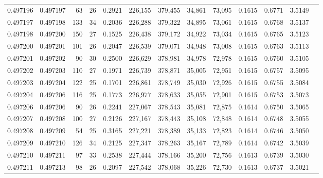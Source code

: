 \begin{tabular}{rrrrrrrrrrrrr}
0.497196 & 0.497197 &  63 &  26 &                                     0.2921 & 226,155 & 379,455 &  34,861 &  73,095 & 0.1615 & 0.6771 & 3.5149 \\
0.497197 & 0.497198 & 133 &  34 &                                     0.2036 & 226,288 & 379,322 &  34,895 &  73,061 & 0.1615 & 0.6768 & 3.5137 \\
0.497198 & 0.497200 & 150 &  27 &                                     0.1525 & 226,438 & 379,172 &  34,922 &  73,034 & 0.1615 & 0.6765 & 3.5123 \\
0.497200 & 0.497201 & 101 &  26 &                                     0.2047 & 226,539 & 379,071 &  34,948 &  73,008 & 0.1615 & 0.6763 & 3.5113 \\
0.497201 & 0.497202 &  90 &  30 &                                     0.2500 & 226,629 & 378,981 &  34,978 &  72,978 & 0.1615 & 0.6760 & 3.5105 \\
0.497202 & 0.497203 & 110 &  27 &                                     0.1971 & 226,739 & 378,871 &  35,005 &  72,951 & 0.1615 & 0.6757 & 3.5095 \\
0.497203 & 0.497204 & 122 &  25 &                                     0.1701 & 226,861 & 378,749 &  35,030 &  72,926 & 0.1615 & 0.6755 & 3.5084 \\
0.497204 & 0.497206 & 116 &  25 &                                     0.1773 & 226,977 & 378,633 &  35,055 &  72,901 & 0.1615 & 0.6753 & 3.5073 \\
0.497206 & 0.497206 &  90 &  26 &                                     0.2241 & 227,067 & 378,543 &  35,081 &  72,875 & 0.1614 & 0.6750 & 3.5065 \\
0.497207 & 0.497208 & 100 &  27 &                                     0.2126 & 227,167 & 378,443 &  35,108 &  72,848 & 0.1614 & 0.6748 & 3.5055 \\
0.497208 & 0.497209 &  54 &  25 &                                     0.3165 & 227,221 & 378,389 &  35,133 &  72,823 & 0.1614 & 0.6746 & 3.5050 \\
0.497209 & 0.497210 & 126 &  34 &                                     0.2125 & 227,347 & 378,263 &  35,167 &  72,789 & 0.1614 & 0.6742 & 3.5039 \\
0.497210 & 0.497211 &  97 &  33 &                                     0.2538 & 227,444 & 378,166 &  35,200 &  72,756 & 0.1613 & 0.6739 & 3.5030 \\
0.497211 & 0.497213 &  98 &  26 &                                     0.2097 & 227,542 & 378,068 &  35,226 &  72,730 & 0.1613 & 0.6737 & 3.5021 \\

\end{tabular}
